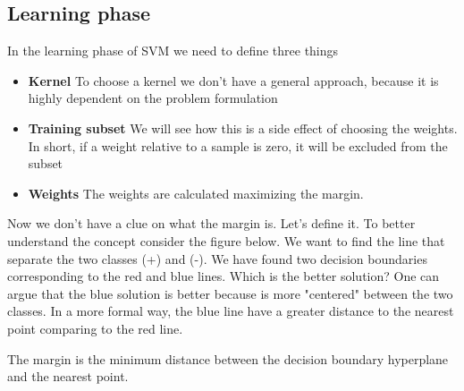 \documentclass[main.tex]{subfiles}
\begin{document}
\subsection{Learning phase}
In the learning phase of SVM we need to define three things
\begin{itemize}
    \item \textbf{Kernel} To choose a kernel we don't have a general approach, because it is highly dependent on the problem formulation
    \item \textbf{Training subset} We will see how this is a side effect of choosing the weights. In short, if a weight relative to a sample is zero, it will be excluded from the subset
    \item \textbf{Weights} The weights are calculated maximizing the margin. 
\end{itemize}
Now we don't have a clue on what the margin is. Let's define it.
To better understand the concept consider the figure below. We want to find the line that separate the two classes (+) and (-). We have found two decision boundaries corresponding to the red and blue lines. Which is the better solution? One can argue that the blue solution is better because is more "centered" between the two classes. In a more formal way, the blue line have a greater distance to the nearest point comparing to the red line. 
\begin{definition}[Margin]
The margin is the minimum distance between the decision boundary hyperplane and the nearest point.
\end{definition}
\end{document}
